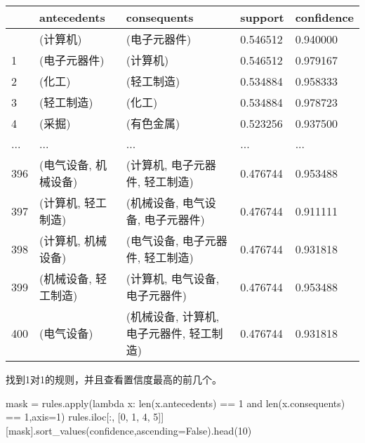 \documentclass[
  letterpaper,
  DIV=11,
  numbers=noendperiod]{scrreprt}
\newenvironment{Shaded}{\begin{snugshade}}{\end{snugshade}}
\newcommand{\BuiltInTok}[1]{\textcolor[rgb]{0.00,0.23,0.31}{#1}}
\newcommand{\DecValTok}[1]{\textcolor[rgb]{0.68,0.00,0.00}{#1}}
\newcommand{\KeywordTok}[1]{\textcolor[rgb]{0.00,0.23,0.31}{#1}}
\newcommand{\NormalTok}[1]{\textcolor[rgb]{0.00,0.23,0.31}{#1}}
\newcommand{\OperatorTok}[1]{\textcolor[rgb]{0.37,0.37,0.37}{#1}}
\newcommand{\StringTok}[1]{\textcolor[rgb]{0.13,0.47,0.30}{#1}}
\newcommand{\VariableTok}[1]{\textcolor[rgb]{0.07,0.07,0.07}{#1}}
\begin{document}
\begin{longtable}[]{@{}lllll@{}}
\toprule\noalign{}
& antecedents & consequents & support & confidence \\
\midrule\noalign{}
\endhead
\bottomrule\noalign{}
\endlastfoot
0 & (计算机) & (电子元器件) & 0.546512 & 0.940000 \\
1 & (电子元器件) & (计算机) & 0.546512 & 0.979167 \\
2 & (化工) & (轻工制造) & 0.534884 & 0.958333 \\
3 & (轻工制造) & (化工) & 0.534884 & 0.978723 \\
4 & (采掘) & (有色金属) & 0.523256 & 0.937500 \\
... & ... & ... & ... & ... \\
396 & (电气设备, 机械设备) & (计算机, 电子元器件, 轻工制造) & 0.476744 &
0.953488 \\
397 & (计算机, 轻工制造) & (机械设备, 电气设备, 电子元器件) & 0.476744 &
0.911111 \\
398 & (计算机, 机械设备) & (电气设备, 电子元器件, 轻工制造) & 0.476744 &
0.931818 \\
399 & (机械设备, 轻工制造) & (计算机, 电气设备, 电子元器件) & 0.476744 &
0.953488 \\
400 & (电气设备) & (机械设备, 计算机, 电子元器件, 轻工制造) & 0.476744 &
0.931818 \\
\end{longtable}

找到1对1的规则，并且查看置信度最高的前几个。

\begin{Shaded}
\begin{Highlighting}[]
\NormalTok{mask }\OperatorTok{=}\NormalTok{ rules.}\BuiltInTok{apply}\NormalTok{(}\KeywordTok{lambda}\NormalTok{ x: }\BuiltInTok{len}\NormalTok{(x.antecedents) }\OperatorTok{==} \DecValTok{1} \KeywordTok{and} \BuiltInTok{len}\NormalTok{(x.consequents) }\OperatorTok{==} \DecValTok{1}\NormalTok{,axis}\OperatorTok{=}\DecValTok{1}\NormalTok{)}
\NormalTok{rules.iloc[:, [}\DecValTok{0}\NormalTok{, }\DecValTok{1}\NormalTok{, }\DecValTok{4}\NormalTok{, }\DecValTok{5}\NormalTok{]][mask].sort\_values(}\StringTok{\textquotesingle{}confidence\textquotesingle{}}\NormalTok{,ascending}\OperatorTok{=}\VariableTok{False}\NormalTok{).head(}\DecValTok{10}\NormalTok{)}
\end{Highlighting}
\end{Shaded}
\end{document}
